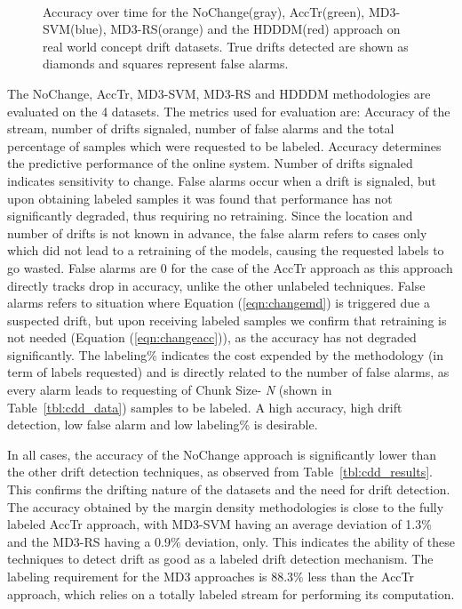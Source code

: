 \documentclass[authoryear,3p,times,twocolumn]{elsarticle}
\begin{document}
\begin{figure*}[t]
\centering
{}
 \\
\caption{Accuracy over time for the NoChange(gray), AccTr(green), MD3-SVM(blue), MD3-RS(orange) and the HDDDM(red) approach on real world concept drift datasets. True drifts detected are shown as diamonds and squares represent false alarms.}
\label{fig:cdd_real}
\end{figure*}

The NoChange, AccTr, MD3-SVM, MD3-RS and HDDDM methodologies are evaluated on the 4 datasets. The metrics used for evaluation are: Accuracy of the stream, number of drifts signaled, number of false alarms and the total percentage of samples which were requested to be labeled. Accuracy determines the predictive performance of the online system. Number of drifts signaled indicates sensitivity to change. False alarms occur when a drift is signaled, but upon obtaining labeled samples it was found that performance has not significantly degraded, thus requiring no retraining. Since the location and number of drifts is not known in advance, the false alarm refers to cases only which did not lead to a retraining of the models, causing the requested labels to go wasted. False alarms are 0 for the case of the AccTr approach as this approach directly tracks drop in accuracy, unlike the other unlabeled techniques. False alarms refers to situation where Equation (\ref{eqn:changemd}) is triggered due a suspected drift, but upon receiving labeled samples we confirm that retraining is not needed (Equation (\ref{eqn:changeacc})), as the accuracy has not degraded significantly. The labeling\% indicates the cost expended by the methodology (in term of labels requested) and is directly related to the number of false alarms, as every alarm leads to requesting of Chunk Size- \textit{N} (shown in Table~\ref{tbl:cdd_data}) samples to be labeled. A high accuracy, high drift detection, low false alarm and low labeling\% is desirable. 

In all cases, the accuracy of the NoChange approach is significantly lower than the other drift detection techniques, as observed from Table~\ref{tbl:cdd_results}. This confirms the drifting nature of the datasets and the need for drift detection. The accuracy obtained by the margin density methodologies is close to the fully labeled AccTr approach, with MD3-SVM having an average deviation of 1.3\% and the MD3-RS having a 0.9\% deviation, only. This indicates the ability of these techniques to detect drift as good as a labeled drift detection mechanism. The labeling requirement for the MD3 approaches is 88.3\% less than the AccTr approach, which relies on a totally labeled stream for performing its computation. 
\end{document}
